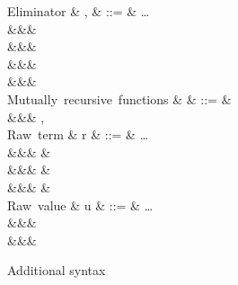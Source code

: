 \begin{figure}
\begin{syntaxfig}
\mbox{Eliminator}
&
\sigma, \tau
&
::=
&
\ldots
\\
&&&
\elimBoolTrue{\kappa}
\\
&&&
\elimBoolFalse{\kappa}
\\
&&&
\elimListSingleton{\branchNil{\kappa}}
\\
&&&
\elimListSingleton{\branchCons{\sigma}}
\\[2mm]
\mbox{Mutually recursive functions}
&
\delta
&
::=
&
\\
&&&
, \delta
\\[2mm]
\mbox{Raw term}
&
r
&
::=
&
\ldots
\\
&&&
\exLambda{\sigma}
&
\\
&&&
&
\\
&&&
&
\\[2mm]
\mbox{Raw value}
&
u
&
::=
&
\ldots
\\
&&&
\exClosure{\rho}{\sigma}
\\
&&&
\exClosureRecMutual{\rho}{\delta}{\sigma}
\end{syntaxfig}
\caption{Additional syntax}
\end{figure}
